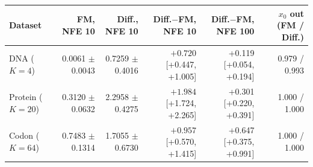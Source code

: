 \begin{tabular}{lrrrrr}
\toprule
Dataset & FM, NFE 10 & Diff., NFE 10 & Diff.$-$FM, NFE 10 & Diff.$-$FM, NFE 100 & $x_0$ out (FM / Diff.) \\
\midrule
DNA ($K{=}4$) & 0.0061 $\pm$ 0.0043 & 0.7259 $\pm$ 0.4016 & $\mathbf{+0.720}$ [+0.447, +1.005] & +0.119 [+0.054, +0.194] & 0.979 / 0.993 \\
Protein ($K{=}20$) & 0.3120 $\pm$ 0.0632 & 2.2958 $\pm$ 0.4275 & $\mathbf{+1.984}$ [+1.724, +2.265] & +0.301 [+0.220, +0.391] & 1.000 / 1.000 \\
Codon ($K{=}64$) & 0.7483 $\pm$ 0.1314 & 1.7055 $\pm$ 0.6730 & $\mathbf{+0.957}$ [+0.570, +1.415] & +0.647 [+0.375, +0.991] & 1.000 / 1.000 \\
\bottomrule
\end{tabular}